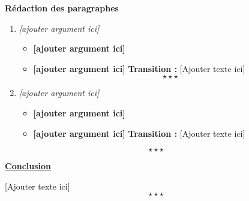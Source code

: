 \begin{center}
	{\bfseries Rédaction des paragraphes}	
\end{center}
\begin{enumerate}[label*=$\longrightarrow$]
	\item \textit{[ajouter argument ici]}
	\begin{itemize}
		\item \textbf{[ajouter argument ici]}
		\item \textbf{[ajouter argument ici]} \newline 
		\textbf{Transition :} [Ajouter texte ici] $$\star \star \star$$
	\end{itemize}
	\item \textit{[ajouter argument ici]}
	\begin{itemize}
		\item \textbf{[ajouter argument ici]}
		\item \textbf{[ajouter argument ici]} \newline 
		\textbf{Transition :} [Ajouter texte ici]
	\end{itemize}
\end{enumerate}
$$\star \star \star$$
\begin{center}
	\textbf{\underline{Conclusion}} 
\end{center} 

[Ajouter texte ici] $$\star \star \star$$
